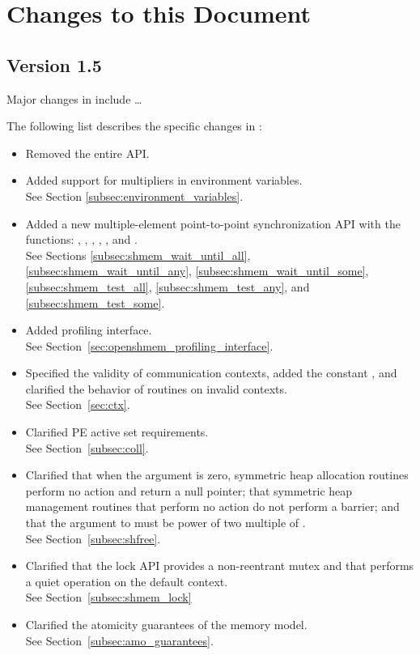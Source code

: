 \chapter{Changes to this Document}\label{sec:changelog}

\section{Version 1.5}
Major changes in \openshmem[1.5] include \dots

The following list describes the specific changes in \openshmem[1.5]:
\begin{itemize}
%
\item Removed the entire \openshmem \Fortran API. 
%
\item Added support for multipliers in 
environment variables.
\\ See Section \ref{subsec:environment_variables}.
%
\item Added a new multiple-element point-to-point synchronization API with
  the functions: , ,
  , ,
  , and .
  \\See Sections \ref{subsec:shmem_wait_until_all},
  \ref{subsec:shmem_wait_until_any}, \ref{subsec:shmem_wait_until_some},
  \ref{subsec:shmem_test_all}, \ref{subsec:shmem_test_any}, and
  \ref{subsec:shmem_test_some}.
%
\item Added \openshmem profiling interface.
  \\ See Section~\ref{sec:openshmem_profiling_interface}.
%
\item Specified the validity of communication contexts, added the constant
  , and clarified the behavior of
   routines on invalid contexts.
  \\ See Section~\ref{sec:ctx}.
%
\item Clarified \ac{PE} active set requirements.
    \\See Section~\ref{subsec:coll}.
%
\item Clarified that when the  argument is zero, symmetric heap
    allocation routines perform no action and return a null pointer; that
    symmetric heap management routines that perform no action do not perform a
    barrier; and that the  argument to  must
    be power of two multiple of .
    \\See Section~\ref{subsec:shfree}.
%
\item Clarified that the \openshmem lock API provides a non-reentrant mutex and
    that  performs a quiet operation on the default
    context.
    \\See Section~\ref{subsec:shmem_lock}
%
\item Clarified the atomicity guarantees of the \openshmem memory model.
    \\See Section~\ref{subsec:amo_guarantees}.
%
\end{itemize}

